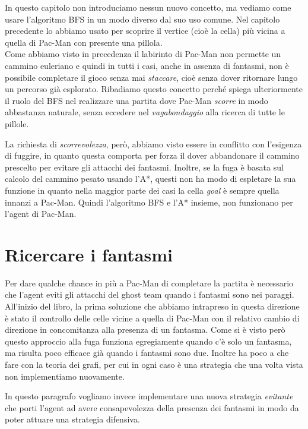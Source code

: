 \documentclass[8pt]{book}
\begin{document}
In questo capitolo non introduciamo nessun nuovo concetto, ma vediamo come usare l'algoritmo BFS in un modo diverso dal suo uso comune. Nel capitolo precedente lo abbiamo usato per scoprire il vertice (cioè la cella) più vicina a quella di Pac-Man con presente una pillola.\\
Come abbiamo visto in precedenza il labirinto di Pac-Man non permette un cammino euleriano e quindi in tutti i casi, anche in assenza di fantasmi, non è possibile completare il gioco senza mai \emph{staccare}, cioè senza dover ritornare lungo un percorso già esplorato. Ribadiamo questo concetto perché spiega ulteriormente il ruolo del BFS nel realizzare una partita dove Pac-Man \emph{scorre} in modo abbastanza naturale, senza eccedere nel \emph{vagabondaggio} alla ricerca di tutte le pillole.

La richiesta di \emph{scorrevolezza}, però, abbiamo visto essere in conflitto con l'esigenza di fuggire, in quanto questa comporta per forza il dover abbandonare il cammino prescelto per evitare gli attacchi dei fantasmi. Inoltre, se la fuga è basata sul calcolo del cammino pesato usando l'A*, questi non ha modo di espletare la sua funzione in quanto nella maggior parte dei casi la cella \emph{goal} è sempre quella innanzi a Pac-Man. Quindi l'algoritmo BFS e l'A* insieme, non funzionano per l'agent di Pac-Man.

\section{Ricercare i fantasmi}

Per dare qualche chance in più a Pac-Man di completare la partita è necessario che l'agent eviti gli attacchi del ghost team quando i fantasmi sono nei paraggi. All'inizio del libro, la prima soluzione che abbiamo intrapreso in questa direzione è stato il controllo delle celle vicine a quella di Pac-Man con il relativo cambio di direzione in concomitanza alla presenza di un fantasma. Come si è visto però questo approccio alla fuga funziona egregiamente quando c'è solo un fantasma, ma risulta poco efficace già quando i fantasmi sono due. Inoltre ha poco a che fare con la teoria dei grafi, per cui in ogni caso è una strategia che una volta vista non implementiamo nuovamente.

In questo paragrafo vogliamo invece implementare una nuova strategia \emph{evitante} che porti l'agent ad avere consapevolezza della presenza dei fantasmi in modo da poter attuare una strategia difensiva.
\end{document}
